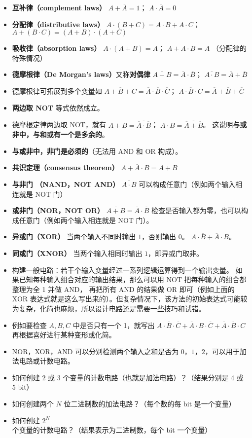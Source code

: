 \begin{itemize}
\item \textbf{互补律（complement laws）} $A+\overline A = 1$； $A\cdot \overline A = 0$
\item \textbf{分配律（distributive laws）} $A\cdot(B+C)=A\cdot B+A\cdot C$； $A+(B\cdot C) = (A+B)\cdot(A+C)$
\item \textbf{吸收律（absorption laws）} $A\cdot(A+B) = A$； $A+A\cdot B = A$ （分配律的特殊情况）
\item \textbf{德摩根律（De Morgan's laws）}又称\textbf{对偶律} $\overline{A+B} = \overline A \cdot \overline B$； $\overline{A \cdot B} = \overline A + \overline B$
\item 德摩根律可拓展到多个变量如 $\overline{A+B+C} = \overline A \cdot \overline B \cdot \overline C$； $\overline{A \cdot B\cdot C} = \overline A + \overline B + \overline C$
\item \textbf{两边取 NOT} 等式依然成立。
\item 德摩根定律两边取 NOT，就有 $A+B = \overline{\overline A \cdot \overline B}$； $A \cdot B = \overline{\overline A + \overline B}$。 这说明\textbf{与或非中，与和或有一个是多余的}。
\item \textbf{与或非中，非门是必须的}（无法用 AND 和 OR 构成）。
\item \textbf{共识定理（consensus theorem）} $A + \overline A \cdot B = A + B$
\item \textbf{与非门 （NAND，NOT AND）} $\overline{A\cdot B}$ 可以构成任意门（例如两个输入相连就是 NOT 门）
\item \textbf{或非门（NOR，NOT OR）} $\overline{A+B}=\overline A\cdot\overline B$ 检查是否输入都为零，也可以构成任意门（例如两个输入相连就是 NOT 门）。
\item \textbf{异或门（XOR）} 当两个输入不同时输出 $1$，否则输出 $0$。 $A\cdot\overline B+\overline A\cdot B$。
\item \textbf{同或门（XNOR）} 当两个输入相同时输出 $1$，即异或门取非。
\item 构建一般电路：若干个输入变量经过一系列逻辑运算得到一个输出变量。 如果已知每种输入组合对应的输出结果，那么可以用 NOT 把每种输入的组合都整理为全 1 并做 AND， 再把所有 AND 的结果做 OR 即可（例如上面的 XOR 表达式就是这么写出来的）。但复杂情况下，该方法的初始表达式可能较为复杂，化简也麻烦，所以设计电路还是需要一些技巧和试错。
\item 例如要检查 $A,B,C$ 中是否只有一个 1，就写出 $A\cdot\overline B\cdot\overline C + \overline A\cdot B\cdot\overline C + \overline A\cdot\overline B\cdot C$ 再根据喜好进行某种变形或化简。
\item NOR，XOR，AND 可以分别检测两个输入之和是否为 $0$，$1$，$2$，可以用于加法电路或计数电路。
\end{itemize}

\begin{exercise}{}
\begin{itemize}
\item 如何创建 2 或 3 个变量的计数电路（也就是加法电路）？（结果分别是 4 或 5 bit）
\item 如何创建两个 $N$ 位二进制数的加法电路？（每个数的每 bit 是一个变量）
\item 如何创建 $2^N$ 个变量的计数电路？（结果表示为二进制数，每个 bit 一个变量）
\end{itemize}
\end{exercise}
